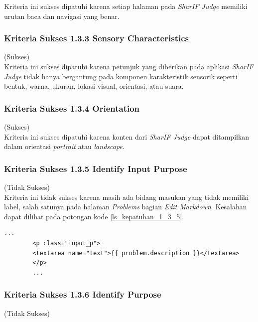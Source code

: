 \documentclass[a4paper,twoside]{article}
\begin{document}
\begin{enumerate}
		Kriteria ini sukses dipatuhi karena setiap halaman pada \textit{SharIF Judge} memiliki urutan baca dan navigasi yang benar.
		
		\subsubsection*{Kriteria Sukses 1.3.3 Sensory Characteristics}
		\label{subsubsec:kepatuhan_kriteria_1.3.3}
		(Sukses)\\
		
		Kriteria ini sukses dipatuhi karena petunjuk yang diberikan pada aplikasi \textit{SharIF Judge} tidak hanya bergantung pada komponen karakteristik sensorik seperti bentuk, warna, ukuran, lokasi visual, orientasi, atau suara.
		
		\subsubsection*{Kriteria Sukses 1.3.4 Orientation}
		\label{subsubsec:kepatuhan_kriteria_1.3.4}
		(Sukses) \\
		
		Kriteria ini sukses dipatuhi karena konten dari \textit{SharIF Judge} dapat ditampilkan dalam orientasi \textit{portrait} atau \textit{landscape}.
		
		\subsubsection*{Kriteria Sukses 1.3.5 Identify Input Purpose}
		\label{subsubsec:kepatuhan_kriteria_1.3.5}
		(Tidak Sukses)\\
		
		Kriteria ini tidak sukses karena masih ada bidang masukan yang tidak memiliki label, salah satunya pada halaman \textit{Problems} bagian \textit{Edit Markdown}. Kesalahan dapat dilihat pada potongan kode \ref{ls_kepatuhan_1_3_5}.
		\begin{lstlisting}[basicstyle=\ttfamily, frame=single,
		columns=fullflexible, keepspaces=true, breaklines=true, label=ls_kepatuhan_1_3_5, caption=Kriteria Sukses 1.3.5 - Elemen Tidak Diberi Label Pada Halaman \textit{Problems} Bagian \textit{Edit Markdown}]
		...
		<p class="input_p">
		<textarea name="text">{{ problem.description }}</textarea>
		</p>
		...
		\end{lstlisting}
		
		\subsubsection*{Kriteria Sukses 1.3.6 Identify Purpose}
		\label{subsubsec:kepatuhan_kriteria_1.3.6}
		(Tidak Sukses) \\
		

\end{enumerate}
\end{document}
